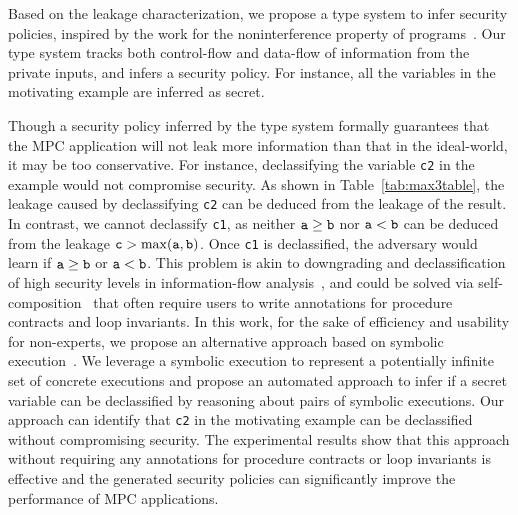 Based on the leakage characterization, we propose a type system to infer security policies,
inspired by the work for  %
the noninterference property of programs~\cite{VolpanoIS96}.
Our type system tracks both control-flow and data-flow of information from the private inputs, and infers
a security policy. For instance,
all the variables in the motivating example are inferred as secret.

Though a security policy inferred by the type system formally guarantees that the MPC application will not leak more information than that in the ideal-world, it may be too conservative.
For instance, declassifying the variable {\tt c2} in the example would not compromise security.
As shown in Table~\ref{tab:max3table}, the leakage caused by declassifying {\tt c2} can be deduced from
the leakage of the result. In contrast, we cannot declassify {\tt c1},
as neither ${\tt a}\geq{\tt b}$ nor ${\tt a}<{\tt b}$ can be deduced from the leakage ${\tt c}>\max({\tt a},{\tt b})$.
Once {\tt c1} is declassified, the adversary would learn
if ${\tt a}\geq{\tt b}$ or ${\tt a}<{\tt b}$.
This problem is akin to downgrading and declassification of high security levels in information-flow analysis~\cite{LiZ05}, and could be solved via self-composition~\cite{TerauchiA05,mpcleak18,YangVSGM18}
that often require users to write annotations for procedure contracts and loop invariants.
In this work, for the sake of efficiency and usability for non-experts,
we propose an alternative approach based on symbolic execution~\cite{King76}.
We leverage a symbolic execution to represent a potentially infinite set of concrete executions and propose an automated approach to infer
if a secret variable can be declassified by reasoning about pairs of symbolic executions.
Our approach can identify that {\tt c2} in the motivating example
can be declassified without compromising security.
The experimental results show that this approach without requiring any annotations for procedure contracts or loop invariants is effective and
the generated security policies can significantly improve
the performance of MPC applications. %

